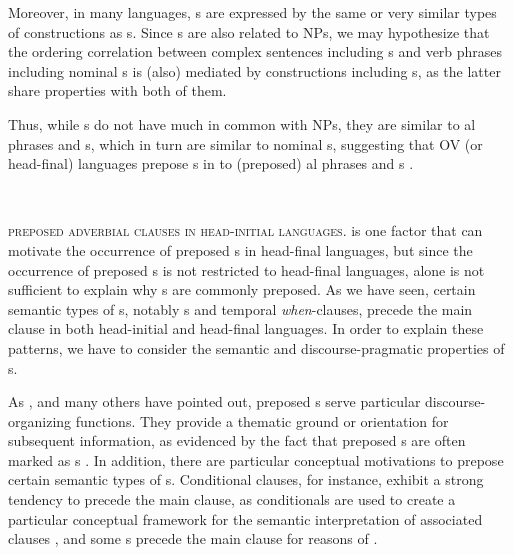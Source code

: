 \documentclass[output=paper]{langsci/langscibook}
\begin{document}
Moreover, in many languages, s are expressed by the same or very similar types of constructions as s. Since s are also related to  NPs, we may hypothesize that the ordering correlation between complex sentences including s and verb phrases including nominal s is (also) mediated by constructions including s, as the latter share properties with both of them.

Thus, while s do not have much in common with  NPs, they are similar to al phrases and s, which in turn are similar to nominal s, suggesting that OV (or head-final) languages prepose s in  to (preposed) al phrases and s .

\ea\label{ex:diessel:17}~\\
\z

\textsc{preposed} \textsc{adverbial} \textsc{clauses} \textsc{in} \textsc{head-initial} \textsc{languages}.  is one factor that can motivate the occurrence of preposed s in head-final languages, but since the occurrence of preposed s is not restricted to head-final languages,  alone is not sufficient to explain why s are commonly preposed. As we have seen, certain semantic types of s, notably s and temporal \textit{when}-clauses, precede the main clause in both head-initial and head-final languages. In order to explain these patterns, we have to consider the semantic and discourse-pragmatic properties of s.

As \citet{Chafe1984}, \citet{Givón1984} and many others have pointed out, preposed s serve particular discourse-organizing functions. They provide a thematic ground or orientation for subsequent information, as evidenced by the fact that preposed s are often marked as s \citep{Haiman1978}. In addition, there are particular conceptual motivations to prepose certain semantic types of s. Conditional clauses, for instance, exhibit a strong tendency to precede the main clause, as conditionals are used to create a particular conceptual framework for the semantic interpretation of associated clauses \citep{Diessel2005}, and some s precede the main clause for reasons of  \citep{Diessel2008}. 
\end{document}

